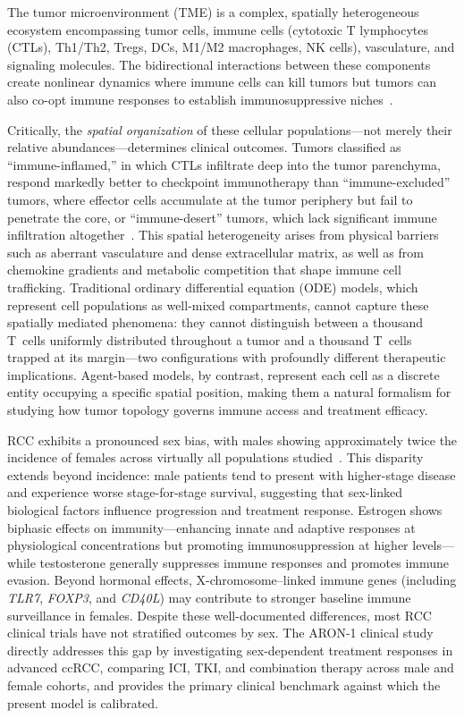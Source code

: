 The tumor microenvironment (TME) is a complex, spatially heterogeneous ecosystem encompassing tumor cells, immune cells (cytotoxic T lymphocytes (CTLs), Th1/Th2, Tregs, DCs, M1/M2 macrophages, NK cells), vasculature, and signaling molecules. The bidirectional interactions between these components create nonlinear dynamics where immune cells can kill tumors but tumors can also co-opt immune responses to establish immunosuppressive niches~\cite{hanahan2011}.

Critically, the \emph{spatial organization} of these cellular populations---not merely their relative abundances---determines clinical outcomes. Tumors classified as ``immune-inflamed,'' in which CTLs infiltrate deep into the tumor parenchyma, respond markedly better to checkpoint immunotherapy than ``immune-excluded'' tumors, where effector cells accumulate at the tumor periphery but fail to penetrate the core, or ``immune-desert'' tumors, which lack significant immune infiltration altogether~\cite{chen2017}. This spatial heterogeneity arises from physical barriers such as aberrant vasculature and dense extracellular matrix, as well as from chemokine gradients and metabolic competition that shape immune cell trafficking. Traditional ordinary differential equation (ODE) models, which represent cell populations as well-mixed compartments, cannot capture these spatially mediated phenomena: they cannot distinguish between a thousand T~cells uniformly distributed throughout a tumor and a thousand T~cells trapped at its margin---two configurations with profoundly different therapeutic implications. Agent-based models, by contrast, represent each cell as a discrete entity occupying a specific spatial position, making them a natural formalism for studying how tumor topology governs immune access and treatment efficacy.

RCC exhibits a pronounced sex bias, with males showing approximately twice the incidence of females across virtually all populations studied~\cite{znaor2015}. This disparity extends beyond incidence: male patients tend to present with higher-stage disease and experience worse stage-for-stage survival, suggesting that sex-linked biological factors influence progression and treatment response. Estrogen shows biphasic effects on immunity---enhancing innate and adaptive responses at physiological concentrations but promoting immunosuppression at higher levels---while testosterone generally suppresses immune responses and promotes immune evasion. Beyond hormonal effects, X-chromosome--linked immune genes (including \emph{TLR7}, \emph{FOXP3}, and \emph{CD40L}) may contribute to stronger baseline immune surveillance in females. Despite these well-documented differences, most RCC clinical trials have not stratified outcomes by sex. The ARON-1 clinical study~\cite{santoni2024} directly addresses this gap by investigating sex-dependent treatment responses in advanced ccRCC, comparing ICI, TKI, and combination therapy across male and female cohorts, and provides the primary clinical benchmark against which the present model is calibrated.

